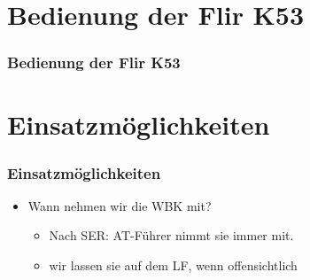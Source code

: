 \documentclass[aspectratio=169]{beamer}
\begin{document}

    \section{Bedienung der Flir K53}
    \begin{frame}
    \frametitle{Bedienung der Flir K53}
    \end{frame}

    \section{Einsatzmöglichkeiten}
    \begin{frame}[t]
    \frametitle{Einsatzmöglichkeiten}
    \begin{itemize}
    \item Wann nehmen wir die WBK mit?
    \begin{itemize}
    \item<2-> Nach SER: AT-Führer nimmt sie immer mit.
        \item<3-> wir lassen sie auf dem LF, wenn offensichtlich
            \end{itemize}
            \end{itemize}
            \end{frame}
            \begin{frame}
            \end{frame}
\end{document}
